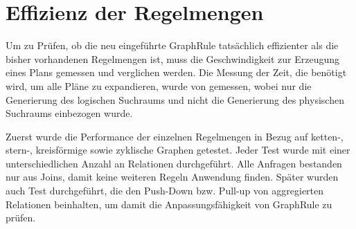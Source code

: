 \section{Effizienz der Regelmengen}

Um zu Prüfen, ob die neu eingeführte GraphRule tatsächlich effizienter als die bisher vorhandenen Regelmengen ist, muss die Geschwindigkeit zur Erzeugung eines Plans gemessen und verglichen werden. Die Messung der Zeit, die benötigt wird, um alle Pläne zu expandieren, wurde von \cite{} gemessen, wobei nur die Generierung des logischen Suchraums und nicht die Generierung des physischen Suchraums einbezogen wurde.

Zuerst wurde die Performance der einzelnen Regelmengen in Bezug auf ketten-, stern-, kreisförmige sowie zyklische  Graphen getestet. Jeder Test wurde mit einer unterschiedlichen Anzahl an Relationen durchgeführt. Alle Anfragen bestanden nur aus Joins, damit keine weiteren Regeln Anwendung finden. Später wurden auch Test durchgeführt, die den Push-Down bzw. Pull-up von aggregierten Relationen beinhalten, um damit die Anpassungsfähigkeit von GraphRule zu prüfen.

